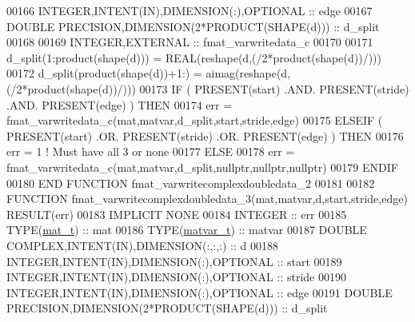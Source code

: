 \begin{DoxyCode}
00166     \textcolor{keywordtype}{INTEGER},\textcolor{keywordtype}{INTENT(IN)},\textcolor{keywordtype}{DIMENSION(:)},\textcolor{keywordtype}{OPTIONAL} :: edge
00167     \textcolor{keywordtype}{DOUBLE PRECISION},\textcolor{keywordtype}{DIMENSION(2*PRODUCT(SHAPE(d)))} :: d\_split
00168 
00169     \textcolor{keywordtype}{INTEGER},\textcolor{keywordtype}{EXTERNAL}                         :: fmat\_varwritedata\_c
00170 
00171     d\_split(1:product(shape(d)))  = \textcolor{keywordtype}{REAL}(reshape(d,(/2*product(shape(d))/)))
00172     d\_split(product(shape(d))+1:) = aimag(reshape(d,(/2*product(shape(d))/)))
00173     \textcolor{keywordflow}{IF} ( \textcolor{keyword}{PRESENT}(start) .AND. \textcolor{keyword}{PRESENT}(stride) .AND. \textcolor{keyword}{PRESENT}(edge) ) \textcolor{keywordflow}{THEN}
00174         err = fmat\_varwritedata\_c(mat,matvar,d\_split,start,stride,edge)
00175     \textcolor{keywordflow}{ELSEIF} ( \textcolor{keyword}{PRESENT}(start) .OR. \textcolor{keyword}{PRESENT}(stride) .OR. \textcolor{keyword}{PRESENT}(edge) ) \textcolor{keywordflow}{THEN}
00176         err = 1    \textcolor{comment}{! Must have all 3 or none}
00177     \textcolor{keywordflow}{ELSE}
00178         err = fmat\_varwritedata\_c(mat,matvar,d\_split,nullptr,nullptr,nullptr)
00179 \textcolor{keywordflow}{    ENDIF}
00180 \textcolor{keyword}{END FUNCTION }fmat\_varwritecomplexdoubledata\_2
00181 
00182 \textcolor{keyword}{FUNCTION }fmat\_varwritecomplexdoubledata\_3(mat,matvar,d,start,stride,edge) \textcolor{keyword}{RESULT}(err)
00183 \textcolor{keywordtype}{IMPLICIT NONE}
00184     \textcolor{keywordtype}{INTEGER}                                    :: err
00185     \textcolor{keywordtype}{TYPE}(\hyperlink{group___m_a_t_gab0fc888f5a5d79943b16284b1f91c2e8}{mat\_t})                                :: mat
00186     \textcolor{keywordtype}{TYPE}(\hyperlink{group___m_a_t_structmatvar__t}{matvar\_t})                             :: matvar
00187     \textcolor{keywordtype}{DOUBLE COMPLEX},\textcolor{keywordtype}{INTENT(IN)},\textcolor{keywordtype}{DIMENSION(:,:,:)} :: d
00188     \textcolor{keywordtype}{INTEGER},\textcolor{keywordtype}{INTENT(IN)},\textcolor{keywordtype}{DIMENSION(:)},\textcolor{keywordtype}{OPTIONAL} :: start
00189     \textcolor{keywordtype}{INTEGER},\textcolor{keywordtype}{INTENT(IN)},\textcolor{keywordtype}{DIMENSION(:)},\textcolor{keywordtype}{OPTIONAL} :: stride
00190     \textcolor{keywordtype}{INTEGER},\textcolor{keywordtype}{INTENT(IN)},\textcolor{keywordtype}{DIMENSION(:)},\textcolor{keywordtype}{OPTIONAL} :: edge
00191     \textcolor{keywordtype}{DOUBLE PRECISION},\textcolor{keywordtype}{DIMENSION(2*PRODUCT(SHAPE(d)))} :: d\_split

\end{DoxyCode}

